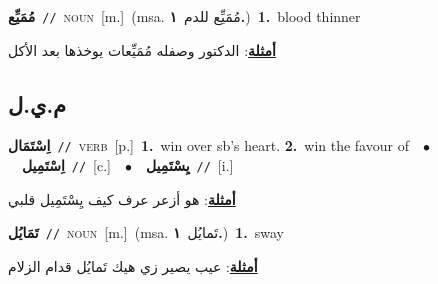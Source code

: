 \documentclass[10pt,a4paper,twoside]{article} %
\begin{document}
\begin{multicols}{2}
{\setlength\topsep{0pt}\textbf{\foreignlanguage{arabic}{مُمَيِّع}}\ {\color{gray}\texttt{//}\color{black}}\ \textsc{noun}\ [m.]\ \color{gray}(msa. \foreignlanguage{arabic}{مُمَيِّع للدم}~\foreignlanguage{arabic}{\textbf{١.}})\color{black}\ \textbf{1.}~blood thinner\  \begin{flushright}\color{gray}\foreignlanguage{arabic}{\textbf{\underline{\foreignlanguage{arabic}{أمثلة}}}: الدكتور وصفله مُمَيِّعات يوخذها بعد الأكل}\end{flushright}\color{black}} \vspace{2mm}

\vspace{-3mm}
\subsection*{\color{blue}\foreignlanguage{arabic}{م.ي.ل}\color{blue}{}} 

{\setlength\topsep{0pt}\textbf{\foreignlanguage{arabic}{اِسْتَمَال}}\ {\color{gray}\texttt{//}\color{black}}\ \textsc{verb}\ [p.]\ \textbf{1.}~win over sb's heart.  \textbf{2.}~win the favour of\ \ $\bullet$\ \ \setlength\topsep{0pt}\textbf{\foreignlanguage{arabic}{اِسْتَمِيل}}\ {\color{gray}\texttt{//}\color{black}}\ [c.]\ \ $\bullet$\ \ \setlength\topsep{0pt}\textbf{\foreignlanguage{arabic}{يِسْتَمِيل}}\ {\color{gray}\texttt{//}\color{black}}\ [i.]\  \begin{flushright}\color{gray}\foreignlanguage{arabic}{\textbf{\underline{\foreignlanguage{arabic}{أمثلة}}}: هو أزعر عرف كيف يِسْتَمِيل قلبي}\end{flushright}\color{black}} \vspace{2mm}

{\setlength\topsep{0pt}\textbf{\foreignlanguage{arabic}{تَمَايُل}}\ {\color{gray}\texttt{//}\color{black}}\ \textsc{noun}\ [m.]\ \color{gray}(msa. \foreignlanguage{arabic}{تَمايُل}~\foreignlanguage{arabic}{\textbf{١.}})\color{black}\ \textbf{1.}~sway\  \begin{flushright}\color{gray}\foreignlanguage{arabic}{\textbf{\underline{\foreignlanguage{arabic}{أمثلة}}}: عيب يصير زي هيك تَمايُل قدام الزلام}\end{flushright}\color{black}} \vspace{2mm}


\end{multicols}
\end{document}

